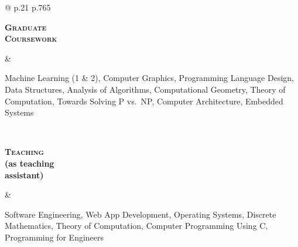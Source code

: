 \documentclass[10pt]{article}
\newcommand{\titlecell}[1]{%
    \begin{minipage}[t]{\linewidth}
        \raggedleft \bf
        #1
    \end{minipage}}
\newcommand{\contentcell}[1]{%
    \begin{minipage}[t]{\linewidth}
        #1
    \end{minipage}}
\newcommand{\tablerowskip}{\smallskip\smallskip}
\begin{document}
\begin{tabular}{@{} p{.21\textwidth} p{.765\textwidth}}
    \titlecell{\textsc{Graduate} \\ \textsc{Coursework}} &
    \contentcell{
        Machine Learning (1 \& 2), Computer Graphics, Programming Language Design, Data Structures, Analysis of Algorithms, Computational Geometry, Theory of Computation, Towards Solving P vs.\ NP, Computer Architecture, Embedded Systems
    }
    \tablerowskip
    \\

    \titlecell{\textsc{Teaching} \\ (as teaching \\ assistant)}&
    \contentcell{
        Software Engineering, Web App Development, Operating Systems, Discrete Mathematics, Theory of Computation, Computer Programming Using C, Programming for Engineers
    }
    \tablerowskip
    \\
\end{tabular}

\end{document}
